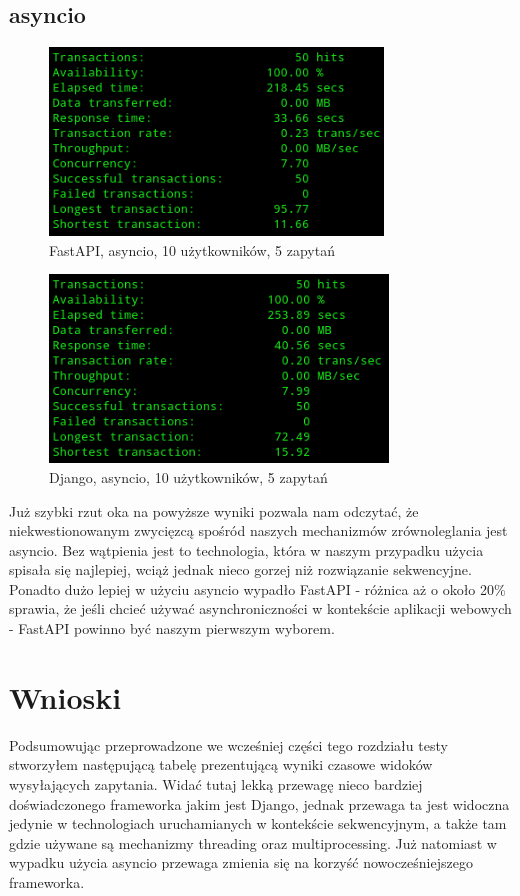 \subsection{asyncio}
\begin{figure}[H]
    \includegraphics[height=50mm]{zdjecia/10_math_asyncio_fast}
    \centering
    \caption{FastAPI, asyncio, 10 użytkowników, 5 zapytań}
\end{figure}

\begin{figure}[H]
    \includegraphics[height=50mm]{zdjecia/10_math_asyncio_django}
    \centering
    \caption{Django, asyncio, 10 użytkowników, 5 zapytań}
\end{figure}
Już szybki rzut oka na powyższe wyniki pozwala nam odczytać, że niekwestionowanym zwycięzcą spośród naszych mechanizmów zrównoleglania jest asyncio. Bez wątpienia jest to technologia, która w naszym przypadku użycia spisała się najlepiej, wciąż jednak nieco gorzej niż rozwiązanie sekwencyjne. Ponadto dużo lepiej w użyciu asyncio wypadło FastAPI - różnica aż o około 20\% sprawia, że jeśli chcieć używać asynchroniczności w kontekście aplikacji webowych - FastAPI powinno być naszym pierwszym wyborem.

\section{Wnioski}

Podsumowując przeprowadzone we wcześniej części tego rozdziału testy stworzyłem następującą tabelę prezentującą wyniki czasowe widoków wysyłających zapytania. Widać tutaj lekką przewagę nieco bardziej doświadczonego frameworka jakim jest Django, jednak przewaga ta jest widoczna jedynie w technologiach uruchamianych w kontekście sekwencyjnym, a także tam gdzie używane są mechanizmy threading oraz multiprocessing. Już natomiast w wypadku użycia asyncio przewaga zmienia się na korzyść nowocześniejszego frameworka. 

